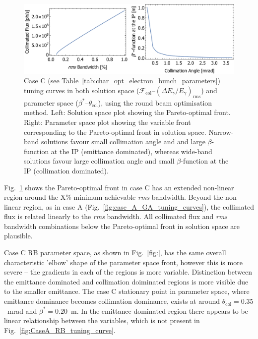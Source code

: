 \documentclass[../main.tex]{subfiles}
\begin{document}
\begin{figure}[!h]
\centering
\includegraphics[width=\textwidth]{Figures/Optimisation_and_Characterisation_of_Inverse_Compton_Scattering_Sources/Case_C_RB_Tuning_Curves.pdf}
\caption{Case C (see Table~\ref{tab:char_opt_electron_bunch_parameters}) tuning curves in both solution space ($\mathcal{F}_{\mathrm{col}}$--$\left(\Delta E_{\gamma}/E_{\gamma}\right)_{\mathrm{rms}}$) and parameter space ($\beta^{*}$--$\theta_{\mathrm{col}}$), using the round beam optimisation method. Left: Solution space plot showing the Pareto-optimal front. Right: Parameter space plot showing the variable front corresponding to the Pareto-optimal front in solution space. Narrow-band solutions favour small collimation angle and and large $\beta$-function at the IP (emittance dominated), whereas wide-band solutions favour large collimation angle and small $\beta$-function at the IP (collimation dominated).}
\label{fig:CaseC_RB_tuning_curve}
\end{figure}

Fig.~\ref{fig:CaseC_RB_tuning_curve} shows the Pareto-optimal front in case C has an extended non-linear region around the X\% minimum achievable \textit{rms} bandwidth. Beyond the non-linear region, as in case A (Fig.~\ref{fig:case_A_GA_tuning_curves}), the collimated flux is related linearly to the \textit{rms} bandwidth. All collimated flux and \textit{rms} bandwidth combinations below the Pareto-optimal front in solution space are plausible.  

Case C RB parameter space, as shown in Fig.~\ref{fig:}, has the same overall characteristic 'elbow' shape of the parameter space front, however this is more severe -- the gradients in each of the regions is more variable. Distinction between the emittance dominated and collimation doiminated regions is more visible due to the smaller emittance. The case C stationary point in parameter space, where emittance dominance becomes collimation dominance, exists at around $\theta_{\mathrm{col}} = 0.35$~\si{\milli\radian} and $\beta^{*} = 0.20$~\si{\meter}. In the emittance dominated region there appears to be linear relationship between the variables, which is not present in Fig.~\ref{fig:CaseA_RB_tuning_curve}.
\end{document}
